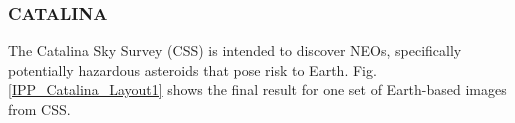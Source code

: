 

\vspace{-0.3cm}
\subsubsection{CATALINA}
The Catalina Sky Survey (CSS) \cite{larson1998catalina,drake2009first} is intended to discover NEOs, specifically potentially hazardous asteroids that pose risk to Earth. Fig. \ref{IPP_Catalina_Layout1} 
shows the final result for one set of Earth-based images from CSS. 
\vspace{-0.3cm}
